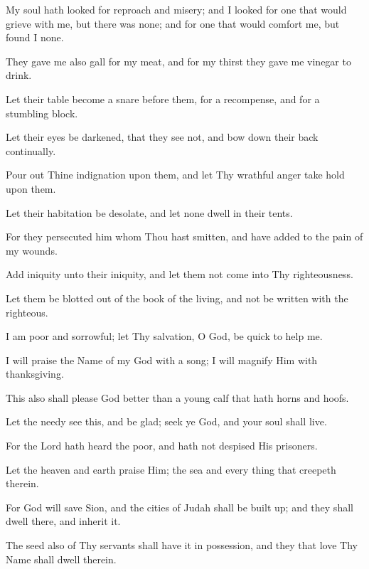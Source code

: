 My soul hath looked for reproach and misery; and I looked for one that would grieve with me, but there was none; and for one that would comfort me, but found I none.

They gave me also gall for my meat, and for my thirst they gave me vinegar to drink.

Let their table become a snare before them, for a recompense, and for a stumbling block.

Let their eyes be darkened, that they see not, and bow down their back continually.

Pour out Thine indignation upon them, and let Thy wrathful anger take hold upon them.

Let their habitation be desolate, and let none dwell in their tents.

For they persecuted him whom Thou hast smitten, and have added to the pain of my wounds.

Add iniquity unto their iniquity, and let them not come into Thy righteousness.

Let them be blotted out of the book of the living, and not be written with the righteous.

I am poor and sorrowful; let Thy salvation, O God, be quick to help me.

I will praise the Name of my God with a song; I will magnify Him with thanksgiving.

This also shall please God better than a young calf that hath horns and hoofs.

Let the needy see this, and be glad; seek ye God, and your soul shall live.

For the Lord hath heard the poor, and hath not despised His prisoners.

Let the heaven and earth praise Him; the sea and every thing that creepeth therein.

For God will save Sion, and the cities of Judah shall be built up; and they shall dwell there, and inherit it.

The seed also of Thy servants shall have it in possession, and they that love Thy Name shall dwell therein.
